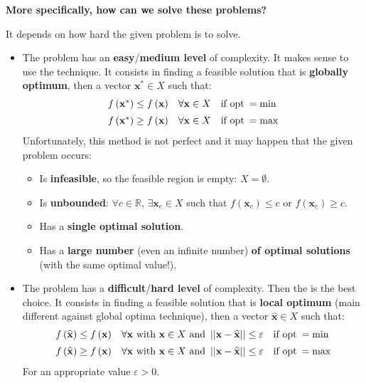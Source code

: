 \highspace
\begin{flushleft}
    \textcolor{Green3}{ \textbf{More specifically, how can we solve these problems?}}
\end{flushleft}
It depends on how hard the given problem is to solve.
\begin{itemize}
    \item The problem has an \textbf{easy}/\textbf{medium level} of complexity. It makes sense to use the  technique. It consists in finding a feasible solution that is \textbf{globally optimum}, then a vector $\mathbf{x}^{*} \in X$ such that:
    \begin{equation*}
        \begin{array}{lll}
            f\left(\mathbf{x}^{*}\right) \le f\left(\mathbf{x}\right) & \forall \mathbf{x} \in X & \text{if } \mathrm{opt} \: = \min \\ [.5em]
            f\left(\mathbf{x}^{*}\right) \ge f\left(\mathbf{x}\right) & \forall \mathbf{x} \in X & \text{if } \mathrm{opt} \: = \max
        \end{array}
    \end{equation*}
    Unfortunately, this method is not perfect and it may happen that the given problem occurs:
    \begin{itemize}
        \item Is \textbf{infeasible}, so the feasible region is empty: $X = \emptyset$.
        \item Is \textbf{unbounded}: $\forall c \in \mathbb{R}$, $\exists\mathbf{x}_{c} \in X$ such that $f\left(\mathbf{x}_{c}\right) \le c$ or $f\left(\mathbf{x}_{c}\right) \ge c$.
        \item Has a \textbf{single optimal solution}.
        \item Has a \textbf{large number} (even an infinite number) \textbf{of optimal solutions} (with the same optimal value!).
    \end{itemize}

    \item The problem has a \textbf{difficult}/\textbf{hard level} of complexity. Then the  is the best choice. It consists in finding a feasible solution that is \textbf{local optimum} (main different against global optima technique), then a vector $\widehat{\mathbf{x}} \in X$ such that:
    \begin{equation*}
        \begin{array}{lll}
            f\left(\widehat{\mathbf{x}}\right) \le f\left(\mathbf{x}\right) & \forall \mathbf{x} \text{ with } \mathbf{x} \in X \text{ and } \left|\left| \mathbf{x} - \widehat{\mathbf{x}} \right|\right| \le \varepsilon & \text{if } \mathrm{opt} \: = \min \\ [.5em]
            f\left(\widehat{\mathbf{x}}\right) \ge f\left(\mathbf{x}\right) & \forall \mathbf{x} \text{ with } \mathbf{x} \in X \text{ and } \left|\left| \mathbf{x} - \widehat{\mathbf{x}} \right|\right| \le \varepsilon & \text{if } \mathrm{opt} \: = \max
        \end{array}
    \end{equation*}
    For an appropriate value $\varepsilon > 0$.


\end{itemize}
